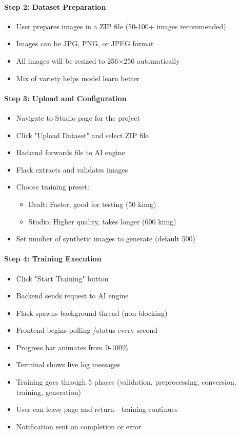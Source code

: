 \documentclass[11pt,a4paper]{article}
\begin{document}
\paragraph{Step 2: Dataset Preparation}
\begin{itemize}[noitemsep]
    \item User prepares images in a ZIP file (50-100+ images recommended)
    \item Images can be JPG, PNG, or JPEG format
    \item All images will be resized to 256×256 automatically
    \item Mix of variety helps model learn better
\end{itemize}

\paragraph{Step 3: Upload and Configuration}
\begin{itemize}[noitemsep]
    \item Navigate to Studio page for the project
    \item Click "Upload Dataset" and select ZIP file
    \item Backend forwards file to AI engine
    \item Flask extracts and validates images
    \item Choose training preset:
    \begin{itemize}
        \item Draft: Faster, good for testing (50 kimg)
        \item Studio: Higher quality, takes longer (600 kimg)
    \end{itemize}
    \item Set number of synthetic images to generate (default 500)
\end{itemize}

\paragraph{Step 4: Training Execution}
\begin{itemize}[noitemsep]
    \item Click "Start Training" button
    \item Backend sends request to AI engine
    \item Flask spawns background thread (non-blocking)
    \item Frontend begins polling /status every second
    \item Progress bar animates from 0-100\%
    \item Terminal shows live log messages
    \item Training goes through 5 phases (validation, preprocessing, conversion, training, generation)
    \item User can leave page and return - training continues
    \item Notification sent on completion or error
\end{itemize}
\end{document}
